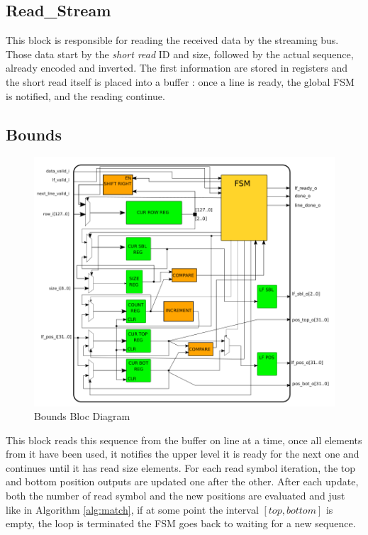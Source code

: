 \subsection{Read\_Stream}



This block is responsible for reading the received data by the streaming bus. Those data start by the \textsl{short read} ID and size, followed by the actual sequence, already encoded and inverted. The first information are stored in registers and the short read itself is placed into a buffer : once a line is ready, the global FSM is notified, and the reading continue.

\subsection{Bounds}


\begin{figure}[H]
    \centering
   \includegraphics[scale = 0.4]{Figures/BOUNDS_DIAG.png}
    \caption{Bounds Bloc Diagram}
    \label{fig:bounds_diag}
\end{figure}



 This block reads this sequence from the buffer on line at a time, once all elements from it have been used, it notifies the upper level it is ready for the next one and continues until it has read \textrm{size} elements. For each read symbol iteration, the top and bottom position outputs are updated one after the other. After each update, both the number of read symbol and the new positions are evaluated and just like in Algorithm \ref{alg:match}, if at some point the interval $ [ top,bottom ] $ is empty, the loop is terminated the FSM goes back to waiting for a new sequence.

